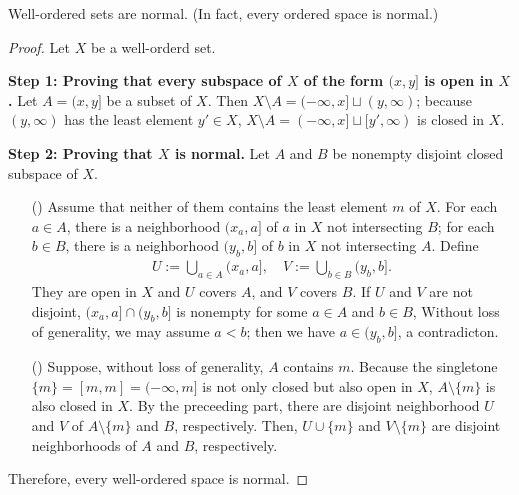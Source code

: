 \begin{thm}
    Well-ordered sets are normal. (In fact, every ordered space is normal.)
\end{thm}
\begin{proof}
    Let $X$ be a well-orderd set.

    \textbf{Step 1: Proving that every subspace of $X$ of the form $(x, y]$ is open in $X$.}\newline\noindent
    Let $A=(x, y]$ be a subset of $X$.
    Then $X\setminus A=(-\infty, x]\sqcup(y, \infty)$; because $(y, \infty)$ has the least element $y'\in X$, $X\setminus A=(-\infty, x]\sqcup[y', \infty)$ is closed in $X$.

    \textbf{Step 2: Proving that $X$ is normal.}\newline\noindent
    Let $A$ and $B$ be nonempty disjoint closed subspace of $X$.
    \begin{enumerate}
        \item[(\romannumeral 1)]
        {
            Assume that neither of them contains the least element $m$ of $X$.
            For each $a\in A$, there is a neighborhood $(x_a, a]$ of $a$ in $X$ not intersecting $B$; for each $b\in B$, there is a neighborhood $(y_b, b]$ of $b$ in $X$ not intersecting $A$.
            Define
            \begin{align*}
                U:=\bigcup_{a\in A}(x_a, a],\quad V:=\bigcup_{b\in B}(y_b, b].
            \end{align*}
            They are open in $X$ and $U$ covers $A$, and $V$ covers $B$.
            If $U$ and $V$ are not disjoint, $(x_a, a]\cap(y_b, b]$ is nonempty for some $a\in A$ and $b\in B$,
            Without loss of generality, we may assume $a<b$; then we have $a\in(y_b, b]$, a contradicton.
        }
        \item[(\romannumeral 2)]
        {
            Suppose, without loss of generality, $A$ contains $m$.
            Because the singletone $\{m\}=[m, m]=(-\infty, m]$ is not only closed but also open in $X$, $A\setminus\{m\}$ is also closed in $X$.
            By the preceeding part, there are disjoint neighborhood $U$ and $V$ of $A\setminus\{m\}$ and $B$, respectively.
            Then, $U\cup\{m\}$ and $V\setminus\{m\}$ are disjoint neighborhoods of $A$ and $B$, respectively.
        }
    \end{enumerate}
    Therefore, every well-ordered space is normal.
\end{proof}

